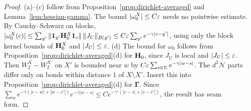 \begin{proof}
(a)--(c) follow from Proposition~\ref{prop:dirichlet-averaged} and Lemma~\ref{lem:hessian-gamma}. The bound $|\omega_0^X|\le C\varepsilon$ needs no pointwise estimate. By Cauchy--Schwarz on blocks, $|\omega_0^X(c)|\le\sum_{y'}\|\mathbf 1_{y'}\mathbf H_0^X\mathbf 1_c\|\,\|J_U\|_{B(y')}\le C\varepsilon\sum_{y'}e^{-\gamma|c-y'|}$, using only the block kernel bounds of $\mathbf H^X_0$ and $|J_U|\le\varepsilon$. (d) The bound for $\omega_0$ follows from Proposition~\ref{prop:dirichlet-averaged}(d) for $\mathbf H_0$, since $J_U$ is local and $|J_U|\le\varepsilon$. Then $W_2^X-W_2^{X'}$ on $X'$ is bounded near $w$ by $C\varepsilon\sum_{s\in\Sigma}e^{-\gamma|w-s|}$. The $d^2\mathcal N$ parts differ only on bonds within distance $1$ of $X\setminus X'$. Insert this into Proposition~\ref{prop:dirichlet-averaged}(d) for $\boldsymbol\Gamma$. Since $\sum_we^{-\gamma(|c-w|+|w-c'|)}e^{-\gamma|w-s|}\le Ce^{-\gamma'(|c-s|+|s-c'|)}$, the result has seam form.


\end{proof}
